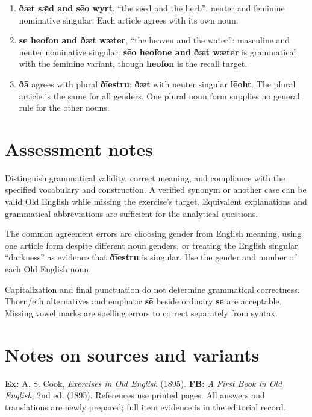 \begin{enumerate}
\item[1.] \textbf{ðæt sǣd and sēo wyrt}, “the seed and the herb”: neuter and feminine nominative singular. Each article agrees with its own noun.
\item[2.] \textbf{se heofon and ðæt wæter}, “the heaven and the water”: masculine and neuter nominative singular. \textbf{sēo heofone and ðæt wæter} is grammatical with the feminine variant, though \textbf{heofon} is the recall target.
\item[3.] \textbf{ðā} agrees with plural \textbf{ðīestru}; \textbf{ðæt} with neuter singular \textbf{lēoht}. The plural article is the same for all genders. One plural noun form supplies no general rule for the other nouns.
\end{enumerate}


\clearpage
{}
\section*{Assessment notes}


Distinguish grammatical validity, correct meaning, and compliance with the specified vocabulary and construction. A verified synonym or another case can be valid Old English while missing the exercise's target. Equivalent explanations and grammatical abbreviations are sufficient for the analytical questions.


The common agreement errors are choosing gender from English meaning, using one article form despite different noun genders, or treating the English singular “darkness” as evidence that \textbf{ðīestru} is singular. Use the gender and number of each Old English noun.


Capitalization and final punctuation do not determine grammatical correctness. Thorn/eth alternatives and emphatic \textbf{sē} beside ordinary \textbf{se} are acceptable. Missing vowel marks are spelling errors to correct separately from syntax.


\begingroup\small
{}
\section*{Notes on sources and variants}


\textbf{Ex:} A. S. Cook, \textit{Exercises in Old English} (1895). \textbf{FB:} \textit{A First Book in Old English}, 2nd ed. (1895). References use printed pages. All answers and translations are newly prepared; full item evidence is in the editorial record.


